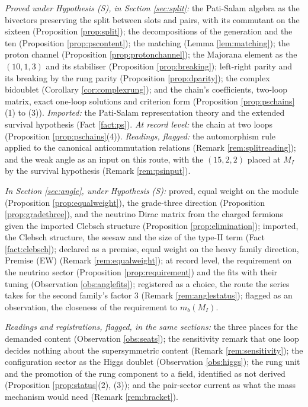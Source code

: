 \documentclass[11pt]{article}
\theoremstyle{definition}
\begin{document}
\emph{Proved under Hypothesis (S), in Section \ref{sec:split}:} the Pati-Salam algebra as the bivectors preserving the split between slots and pairs, with its commutant on the sixteen (Proposition \ref{prop:split}); the decompositions of the generation and the ten (Proposition \ref{prop:pscontent}); the matching (Lemma \ref{lem:matching}); the proton channel (Proposition \ref{prop:protonchannel}); the Majorana element as the $(10,1,3)$ and its stabiliser (Proposition \ref{prop:breaking}); left-right parity and its breaking by the rung parity (Proposition \ref{prop:dparity}); the complex bidoublet (Corollary \ref{cor:complexrung}); and the chain's coefficients, two-loop matrix, exact one-loop solutions and criterion form (Proposition \ref{prop:pschains}(1) to (3)). \emph{Imported:} the Pati-Salam representation theory and the extended survival hypothesis (Fact \ref{fact:ps}). \emph{At record level:} the chain at two loops (Proposition \ref{prop:pschains}(4)). \emph{Readings, flagged:} the automorphism rule applied to the canonical anticommutation relations (Remark \ref{rem:splitreading}); and the weak angle as an input on this route, with the $(15,2,2)$ placed at $M_{I}$ by the survival hypothesis (Remark \ref{rem:psinput}).

\emph{In Section \ref{sec:angle}, under Hypothesis (S):} proved, equal weight on the module (Proposition \ref{prop:equalweight}), the grade-three direction (Proposition \ref{prop:gradethree}), and the neutrino Dirac matrix from the charged fermions given the imported Clebsch structure (Proposition \ref{prop:elimination}); imported, the Clebsch structure, the seesaw and the size of the type-II term (Fact \ref{fact:clebsch}); declared as a premise, equal weight on the heavy family direction, Premise (EW) (Remark \ref{rem:equalweight}); at record level, the requirement on the neutrino sector (Proposition \ref{prop:requirement}) and the fits with their tuning (Observation \ref{obs:anglefits}); registered as a choice, the route the series takes for the second family's factor $3$ (Remark \ref{rem:anglestatus}); flagged as an observation, the closeness of the requirement to $m_{b}(M_{I})$.

\emph{Readings and registrations, flagged, in the same sections:} the three places for the demanded content (Observation \ref{obs:seats}); the sensitivity remark that one loop decides nothing about the supersymmetric content (Remark \ref{rem:sensitivity}); the configuration sector as the Higgs doublet (Observation \ref{obs:higgs}); the rung unit and the promotion of the rung component to a field, identified as not derived (Proposition \ref{prop:status}(2), (3)); and the pair-sector current as what the mass mechanism would need (Remark \ref{rem:bracket}).
\end{document}
